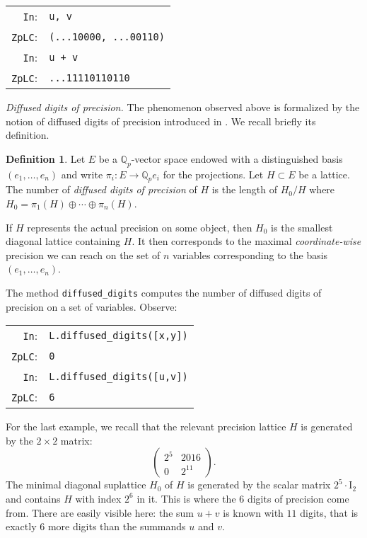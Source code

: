 \documentclass[sigconf]{acmart}
\newcommand{\Q}{\mathbb Q}
\newcommand{\Qp}{\Q_p}
\newcommand{\cIn}{{\color{input} \tt \phantom{Zp}In}:}
\newcommand{\cZpLC}{{\color{output} \tt ZpLC}:}
\theoremstyle{definition}
\newtheorem{deftn}[theo]{Definition}
\begin{document}
\smallskip

{\noindent \small
\begin{tabular}{rl}
\cIn   & \verb?u, v? \\
\cZpLC & \verb?(...10000, ...00110)? \\
\cIn   & \verb?u + v? \\
\cZpLC & \verb?...11110110110? \\
\end{tabular}}

\medskip

\noindent \textit{Diffused digits of precision.}
%
The phenomenon observed above is formalized by the notion of diffused
digits of precision introduced in \cite{caruso-roe-vaccon:15}.
We recall briefly its definition.

\begin{deftn}
\label{def:diffused}
Let $E$ be a $\Qp$-vector space endowed with a distinguished basis 
$(e_1, \ldots, e_n)$ and write $\pi_i : E \to \Qp e_i$ for the 
projections.
Let $H \subset E$ be a lattice. The number of \emph{diffused digits of 
precision} of $H$ is the length of $H_0/H$ where $H_0 = \pi_1(H) \oplus 
\cdots \oplus \pi_n(H)$.
\end{deftn}

If $H$ represents the actual precision on some object, then
$H_0$ is the smallest diagonal lattice containing $H$. It then
corresponds to the maximal \emph{coordinate-wise} precision we can 
reach on the set of $n$ variables corresponding to the basis $(e_1,
\ldots, e_n)$.

The method {\color{method}\verb?diffused_digits?} computes the number of
diffused digits of precision on a set of variables. Observe:

\smallskip

{\noindent \small
\begin{tabular}{rl}
\cIn   & \verb?L.?{\color{method}\verb?diffused_digits?}\verb?([x,y])? \\
\cZpLC & \verb?0? \\
\cIn   & \verb?L.?{\color{method}\verb?diffused_digits?}\verb?([u,v])? \\
\cZpLC & \verb?6? \\
\end{tabular}}

\smallskip

\noindent
For the last example, we recall that the relevant precision lattice 
$H$ is generated by the $2 \times 2$ matrix:
$$\left(\begin{matrix} 2^5 & 2016 \\ 0 & 2^{11} \end{matrix}\right).$$
The minimal diagonal suplattice $H_0$ of $H$ is generated by the scalar matrix 
$2^5 \cdot \text{I}_2$ and contains $H$ with index $2^6$ in it. This is 
where the $6$ digits of precision come from.
There are easily visible here: the sum $u+v$ is known with $11$ digits,
that is exactly $6$ more digits than the summands $u$ and $v$.
\end{document}
